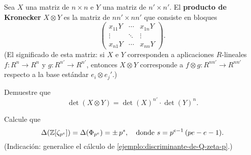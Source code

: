 
\begin{ejercicio}
  \label{ejerc:producto-de-kronecker}
  Sea $X$ una matriz de $n\times n$ e $Y$ una matriz de $n'\times n'$.
  El \textbf{producto de Kronecker} $X\otimes Y$ es la matriz de
  $nn' \times nn'$ que consiste en bloques
  \[ \begin{pmatrix}
    x_{11} Y & \cdots & x_{1n} Y \\
    \vdots & \ddots & \vdots \\
    x_{n1} Y & \cdots & x_{nn} Y
  \end{pmatrix}. \]
  (El significado de esta matriz: si $X$ e $Y$ corresponden a aplicaciones
  $R$-lineales $f\colon R^n \to R^n$ y $g\colon R^{n'}\to R^{n'}$, entonces
  $X\otimes Y$ corresponde a $f\otimes g\colon R^{nn'} \to R^{nn'}$
  respecto a la base estándar $e_i\otimes e_j'$.)

  Demuestre que
  $$\det (X\otimes Y) = \det (X)^{n'} \cdot \det (Y)^n.$$
\end{ejercicio}

\begin{ejercicio}
  Calcule que
  \[ \Delta (\mathbb{Z} [\zeta_{p^e}]) = \Delta (\Phi_{p^e}) = \pm\,p^s,
     \quad \text{donde } s = p^{e-1}\,(pe - e - 1). \]
  (Indicación: generalice el cálculo de
  \ref{ejemplo:discriminante-de-Q-zeta-p}.)
\end{ejercicio}
